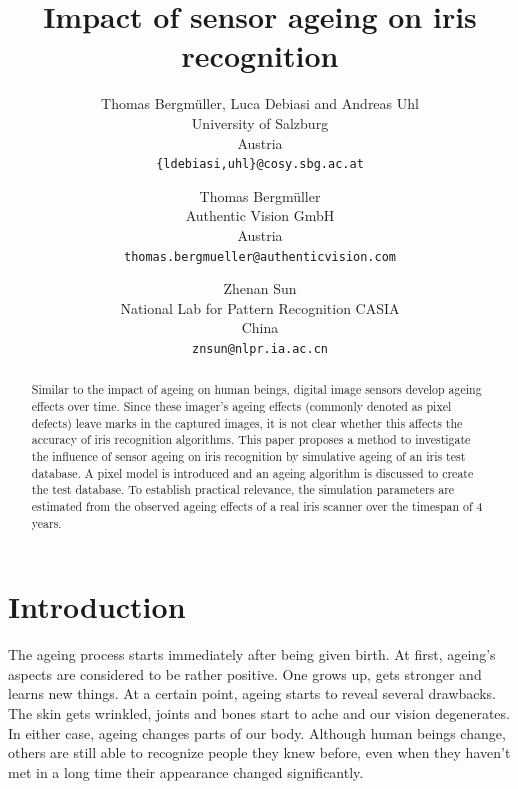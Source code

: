 \documentclass[10pt,twocolumn,letterpaper]{article}
\begin{document}
\title{Impact of sensor ageing on iris recognition}

\author{Thomas Bergm{\"u}ller, Luca Debiasi and Andreas Uhl\\
University of Salzburg\\
Austria\\
{\tt\small \{ldebiasi,uhl\}@cosy.sbg.ac.at}
\and
Thomas Bergm{\"u}ller \\
Authentic Vision GmbH\\
Austria\\
{\tt\small thomas.bergmueller@authenticvision.com}
\and
Zhenan Sun\\
National Lab for Pattern Recognition CASIA\\
China\\
{\tt\small znsun@nlpr.ia.ac.cn}
}


\maketitle
\thispagestyle{empty}

\begin{abstract}
   Similar to the impact of ageing on human beings, digital image sensors develop ageing effects over time. Since these imager's ageing effects (commonly denoted as pixel defects) leave marks in the captured images, it is not clear whether this affects the accuracy of iris recognition algorithms. This paper proposes a method to investigate the influence of sensor ageing on iris recognition by simulative ageing of an iris test database. A pixel model is introduced and an ageing algorithm is discussed to create the test database. To establish practical relevance, the simulation parameters are estimated from the observed ageing effects of a real iris scanner over the timespan of 4 years.
\end{abstract}




\section{Introduction}
The ageing process starts immediately after being given birth. At first, ageing's aspects are considered to be rather positive. One grows up, gets stronger and learns new things. At a certain point, ageing starts to reveal several drawbacks. The skin gets wrinkled, joints and bones start to ache and our vision degenerates. In either case, ageing changes parts of our body. Although human beings change, others are still able to recognize people they knew before, even when they haven't met in a long time their appearance changed significantly.
\end{document}
